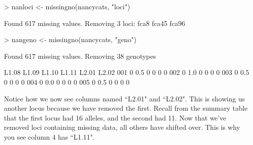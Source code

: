 \documentclass[letterpaper]{article}
\begin{document}
\begin{Schunk}
\begin{Sinput}
> nanloci <-  missingno(nancycats, "loci")
\end{Sinput}
\begin{Soutput}
 Found 617 missing values.
 Removing 3 loci: fca8 fca45 fca96 
\end{Soutput}
\begin{Sinput}
> nangeno <-  missingno(nancycats, "geno")
\end{Sinput}
\begin{Soutput}
 Found 617 missing values.
 Removing 38 genotypes
\end{Soutput}
\begin{Soutput}
    L1.08 L1.09 L1.10 L1.11 L2.01 L2.02
001     0   0.5     0     0     0     0
002     0   1.0     0     0     0     0
003     0   0.5     0     0     0     0
004     0   0.0     0     0     0     0
005     0   0.5     0     0     0     0
\end{Soutput}
\end{Schunk}

Notice how we now see columns named ``L2.01" and ``L2.02". This is showing us another locus because we have removed the first. Recall from the summary table that the first locus had 16 alleles, and the second had 11. Now that we've removed loci containing missing data, all others have shifted over. This is why you see column 4 has ``L1.11".\\
\end{document}

